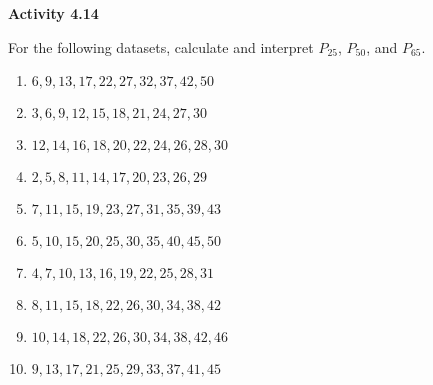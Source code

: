 \vspace{0.3ex}
\noindent\textbf{Activity 4.14}

\vspace{0.2ex}

For the following datasets, calculate and interpret \(P_{25}\), \(P_{50}\), and \(P_{65}\). 

\begin{enumerate}
    \item \(6, 9, 13, 17, 22, 27, 32, 37, 42, 50\)  
    \item \(3, 6, 9, 12, 15, 18, 21, 24, 27, 30\)  
    \item \(12, 14, 16, 18, 20, 22, 24, 26, 28, 30\)  
    \item \(2, 5, 8, 11, 14, 17, 20, 23, 26, 29\)  
    \item \(7, 11, 15, 19, 23, 27, 31, 35, 39, 43\)  
    \item \(5, 10, 15, 20, 25, 30, 35, 40, 45, 50\)  
    \item \(4, 7, 10, 13, 16, 19, 22, 25, 28, 31\)  
    \item \(8, 11, 15, 18, 22, 26, 30, 34, 38, 42\)  
    \item \(10, 14, 18, 22, 26, 30, 34, 38, 42, 46\)  
    \item \(9, 13, 17, 21, 25, 29, 33, 37, 41, 45\)  
\end{enumerate}
